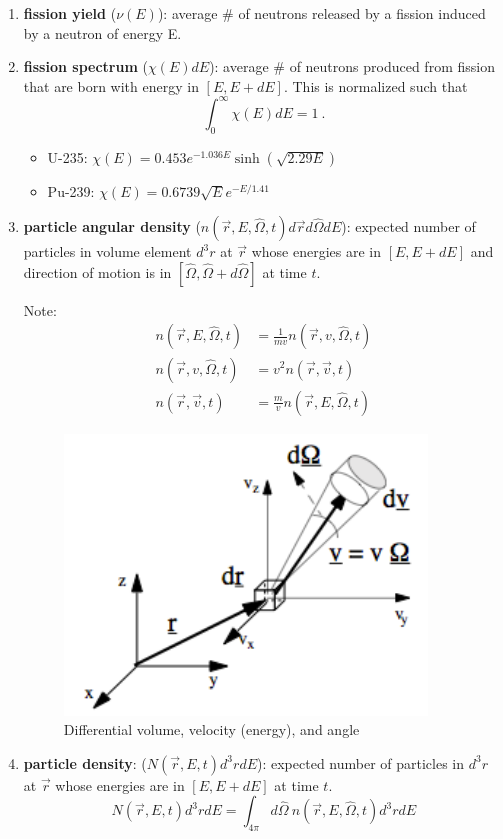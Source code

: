 \documentclass[12pt]{article}
\newcommand{\vOmega}{\ensuremath{\hat{\Omega}}}
\begin{document}
\begin{enumerate}
\item \textbf{fission yield} ($\nu(E)$): average \# of neutrons released by a fission induced by a neutron of energy E.

\item \textbf{fission spectrum} ($\chi(E)dE$): average \# of neutrons produced from fission that are born with energy in $[E, E + dE]$. This is normalized such that
\[\int_0^{\infty} \chi(E)dE =1\:.\]


\begin{itemize}
\item U-235: $\chi(E) = 0.453 e^{-1.036E} \sinh(\sqrt{2.29E})$
\item Pu-239: $\chi(E) = 0.6739 \sqrt{E} e^{-E / 1.41}$
\end{itemize}

\item \textbf{particle angular density} ($n(\vec{r}, E, \vOmega, t)d\vec{r} d\vOmega dE$): expected number of particles in volume element $d^3r$ at $\vec{r}$ whose energies are in $[E, E + dE]$ and direction of motion is in $[\vOmega, \vOmega + d\vOmega]$ at time $t$.

Note:
\begin{align*}
n(\vec{r}, E, \vOmega, t) &= \frac{1}{mv}n(\vec{r}, v, \vOmega, t) \\
n(\vec{r}, v, \vOmega, t) &= v^2 n(\vec{r}, \vec{v}, t) \\
n(\vec{r}, \vec{v}, t) &= \frac{m}{v}n(\vec{r}, E, \vOmega, t)
\end{align*}
\begin{figure}[h!]
    \begin{center}
    \includegraphics[keepaspectratio, width = 2.5 in]{../figs/differential-element}
    \end{center}
    \caption{Differential volume, velocity (energy), and angle}
    \label{fig:phase_space}
\end{figure}

\item \textbf{particle density}: ($N(\vec{r},E,t)d^3r dE$): expected number of particles in $d^3r$ at $\vec{r}$ whose energies are in $[E, E + dE]$ at time $t$.
\[N(\vec{r},E,t)d^3r dE = \int_{4\pi} d\vOmega\: n(\vec{r}, E, \vOmega, t)d^3r dE \]


\end{enumerate}
\end{document}
